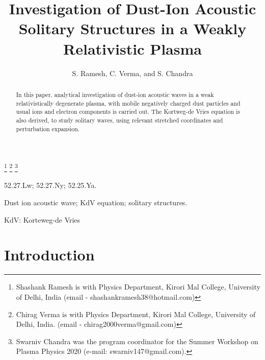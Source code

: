 \documentclass[journal]{IEEEtran}
\begin{document}
	
\title{Investigation of Dust-Ion Acoustic Solitary Structures in a Weakly Relativistic Plasma}
\author{S. Ramesh, C. Verma, and S. Chandra}

\thanks{Shashank Ramesh is with Physics Department, Kirori Mal College, University of Delhi, India (email - shashankramesh38@hotmail.com)}
\thanks{Chirag Verma is with Physics Department, Kirori Mal College, University of Delhi, India. (email - chirag2000verma@gmail.com)}
\thanks{Swarniv Chandra was the program coordinator for the Summer Workshop on Plasma Physics 2020 (e-mail: swarniv147@gmail.com).}
\maketitle
\thispagestyle{empty}

\begin{abstract}
In this paper, analytical investigation of dust-ion acoustic waves
in a weak relativistically degenerate plasma, with mobile negatively charged dust particles and usual ions and electron components is carried out. The Kortweg-de Vries equation is also derived, to study solitary waves, using relevant stretched coordinates and perturbation expansion.
\end{abstract}

\renewcommand\IEEEkeywordsname{PACS}
	
\begin{IEEEkeywords}
	52.27.Lw; 52.27.Ny; 52.25.Ya.
\end{IEEEkeywords}


\renewcommand\IEEEkeywordsname{Keywords}

\begin{IEEEkeywords}
	Dust ion acoustic wave; KdV equation; solitary structures.
\end{IEEEkeywords}

\renewcommand\IEEEkeywordsname{Nomenclature}

\begin{IEEEkeywords}
KdV: Korteweg-de Vries
\end{IEEEkeywords}

\IEEEpeerreviewmaketitle


\section{Introduction}
\end{document}
